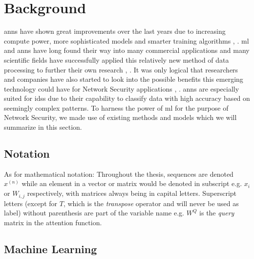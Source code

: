 \chapter{Background} \label{sec:background}

\glspl{ann} have shown great improvements over the last years due to increasing compute power, more sophisticated models and smarter training algorithms \cite{reboot_acgan}, \cite{unsupervised_learning_video_segmentation}. \gls{ml} and \glspl{ann} have long found their way into many commercial applications and many scientific fields have successfully applied this relatively new method of data processing to further their own research \cite{alpha_fold}, \cite{ai_medicine}. It was only logical that researchers and companies have also started to look into the possible benefits this emerging technology could have for Network Security applications \cite{kitsune}, \cite{ml_ids_survey}. \glspl{ann} are especially suited for \glspl{ids} due to their capability to classify data with high accuracy based on seemingly complex patterns. To harness the power of \gls{ml} for the purpose of Network Security, we made use of existing methods and models which we will summarize in this section.

\section{Notation} \label{sec:background:terminology:notation}

As for mathematical notation: Throughout the thesis, sequences are denoted $x^{(n)}$ while an element in a vector or matrix would be denoted in subscript e.g. $x_i$ or $W_{i,j}$ respectively, with matrices always being in capital letters. Superscript letters (except for $T$, which is the \textit{transpose} operator and will never be used as label) without parenthesis are part of the variable name e.g. $W^Q$ is the \textit{query} matrix in the attention function. 

\section{Machine Learning} \label{sec:background:ml}

